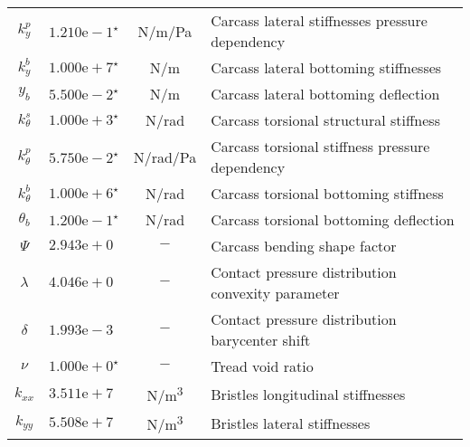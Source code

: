 \begin{longtable}{cccl}
$k_y^p$            & $1.210\mathrm{e-}1^\star$           & \unit[per-mode=symbol]{\newton\per\meter\per\pascal}        & Carcass lateral stiffnesses pressure dependency \\
$k_y^b$            & $1.000\mathrm{e+}7^\star$           & \unit[per-mode=symbol]{\newton\per\meter}                   & Carcass lateral bottoming stiffnesses \\
$y_b$              & $5.500\mathrm{e-}2^\star$           & \unit[per-mode=symbol]{\newton\per\meter}                   & Carcass lateral bottoming deflection \\
$k_\theta^s$       & $1.000\mathrm{e+}3^\star$           & \unit[per-mode=symbol]{\newton\per\radian}                  & Carcass torsional structural stiffness \\
$k_\theta^p$       & $5.750\mathrm{e-}2^\star$           & \unit[per-mode=symbol]{\newton\per\radian\per\pascal}       & Carcass torsional stiffness pressure dependency \\
$k_\theta^b$       & $1.000\mathrm{e+}6^\star$           & \unit[per-mode=symbol]{\newton\per\radian}                  & Carcass torsional bottoming stiffness \\
$\theta_b$         & $1.200\mathrm{e-}1^\star$           & \unit[per-mode=symbol]{\newton\per\radian}                  & Carcass torsional bottoming deflection \\
$\Psi$             & $2.943\mathrm{e+}0\phantom{^\star}$ & $-$                                                         & Carcass bending shape factor \\
$\lambda$          & $4.046\mathrm{e+}0\phantom{^\star}$ & $-$                                                         & Contact pressure distribution convexity parameter \\
$\delta$           & $1.993\mathrm{e-}3\phantom{^\star}$ & $-$                                                         & Contact pressure distribution barycenter shift \\
$\nu$              & $1.000\mathrm{e+}0^\star$           & $-$                                                         & Tread void ratio \\
$k_{xx}$           & $3.511\mathrm{e+}7\phantom{^\star}$ & \unit[per-mode=symbol]{\newton\per\cubic\meter}             & Bristles longitudinal stiffnesses \\
$k_{yy}$           & $5.508\mathrm{e+}7\phantom{^\star}$ & \unit[per-mode=symbol]{\newton\per\cubic\meter}             & Bristles lateral stiffnesses \\

\end{longtable}
